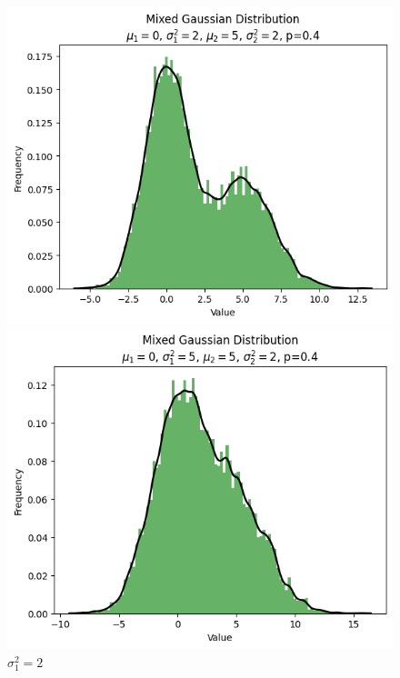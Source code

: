 \documentclass{article}
\begin{document}
\begin{figure}[H]
\begin{minipage}[b]{0.3\linewidth}
        \caption{$\sigma_1^2=0.5$}
    \end{minipage}
    \hfill
    \begin{minipage}[b]{0.3\linewidth}
        \centering
        \includegraphics[width=\linewidth]{figure/sigma_1^2=2.png}
        \caption{$\sigma_1^2=2$}
    \end{minipage}
    \vspace{4mm} %
    \begin{minipage}[b]{0.3\linewidth}
        \centering
        \includegraphics[width=\linewidth]{figure/sigma_1^2=5.png}

\end{minipage}
\end{figure}
\end{document}
